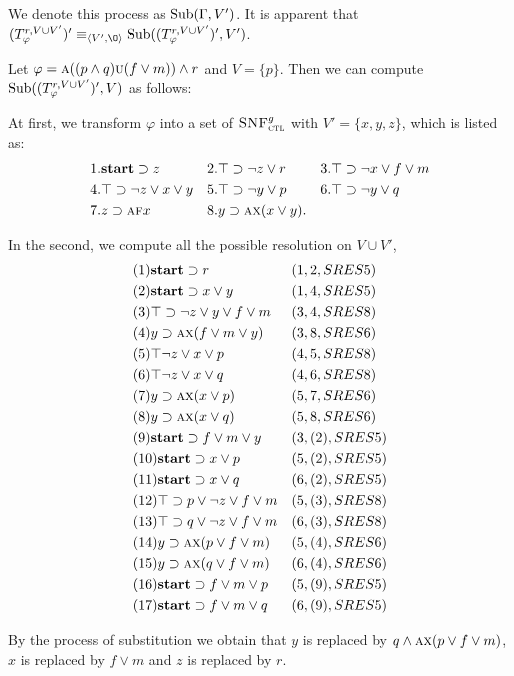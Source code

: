 \documentclass{article}
\begin{document}
We denote this process as $\textrm{Sub}(\Gamma, V')$. It is apparent that $(T_{\varphi}^{r,V \cup V'})' \equiv_{\tuple{V',{\O}}} \Sub((T_{\varphi}^{r,V \cup V'})',V')$.
\begin{example}\label{exa:until:sub}
Let $\varphi=\textsc{a}((p\wedge q) \textsc{u} (f\vee m)) \wedge r$ and $V=\{p\}$. Then we can compute $\textrm{Sub}((T_{\varphi}^{r,V \cup V'})', V)$ as follows:

At first, we transform $\varphi$ into a set of ${\textsc{SNF}_{\textsc{ctl}}^g}$ with $V'=\{x,y,z\}$, which is listed as:
\begin{align*}
& 1. \textbf{start}\supset z && 2. \top \supset \neg z \vee r && 3.\top \supset \neg x\vee f \vee m\\
& 4. \top \supset \neg z \vee x \vee y && 5.\top \supset \neg y \vee p && 6.\top \supset \neg y \vee q\\
& 7. z \supset \textsc{a} \textsc{f} x && 8. y \supset \textsc{a} \textsc{x}(x\vee y).
\end{align*}

In the second, we compute all the possible resolution on $V\cup V'$,
\begin{align*}
&(1) \textbf{start} \supset r && (1,2,SRES 5)\\
&(2) \textbf{start} \supset x \vee y && (1,4,SRES 5)\\
&(3) \top \supset \neg z \vee y \vee f \vee m && (3, 4, SRES 8)\\
&(4) y \supset \textsc{a}\textsc{x}(f\vee m\vee y) && (3,8, SRES 6)\\
&(5) \top \neg z \vee x \vee p && (4,5, SRES 8)\\
&(6) \top \neg z \vee x \vee q && (4,6, SRES 8)\\
&(7) y \supset \textsc{a}\textsc{x}(x\vee p) && (5, 7, SRES 6)\\
&(8) y \supset \textsc{a}\textsc{x}(x\vee q) && (5, 8, SRES 6)\\
&(9) \textbf{start} \supset f\vee m \vee y && (3,(2), SRES 5) \\
&(10) \textbf{start} \supset x \vee p && (5,(2),SRES 5) \\
&(11) \textbf{start} \supset x \vee q && (6,(2), SRES 5) \\
&(12) \top \supset p \vee \neg z \vee f \vee m && (5,(3), SRES 8)\\
&(13) \top \supset q \vee \neg z \vee f \vee m && (6,(3), SRES 8)\\
&(14) y \supset \textsc{a}\textsc{x}(p \vee f\vee m) && (5, (4), SRES 6) \\
&(15) y \supset \textsc{a}\textsc{x}(q \vee f\vee m) && (6, (4), SRES 6) \\
&(16) \textbf{start} \supset f\vee m \vee p && (5, (9), SRES 5) \\
&(17) \textbf{start} \supset f\vee m \vee q && (6, (9), SRES 5)
\end{align*}

By the process of substitution we obtain that $y$ is replaced by $q \wedge \textsc{a}\textsc{x}(p \vee f\vee m)$, $x$ is replaced by $f\vee m$ and $z$ is replaced by $r$.
\end{example}
\end{document}
